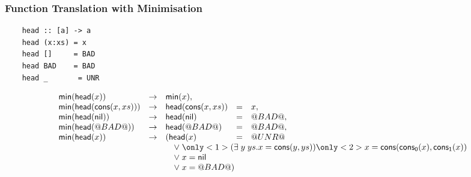 \documentclass[serif,professionalfont]{beamer}
\begin{document}
\begin{frame}[fragile]
  \frametitle{Function Translation with Minimisation}

  \begin{verbatim}
    head :: [a] -> a
    head (x:xs) = x
    head []     = BAD
    head BAD    = BAD
    head _       = UNR
  \end{verbatim}
  \[\begin{array}{lllll}
  \Min(\head{x})            & \to & \Min(x),            &   & \\
  \Min(\head{\cons{x}{xs}}) & \to & \head{\cons{x}{xs}} & = & x,    \\
  \Min(\head{\nil})         & \to & \head{\nil}         & = & \bad, \\
  \Min(\head{\bad})         & \to & \head{\bad}         & = & \bad, \\
  \Min(\head{x})            & \to & (\head{x}            & = & \unr \\
  & & \multicolumn{3}{l}{\quad \lor \; \only<1>{(\exists \; y \; ys . x = \cons{y}{ys})}
                                   \only<2>{x = \cons{\conspi{x}}{\conspii{x}}}} \\
  & & \multicolumn{3}{l}{\quad \lor \; x = \nil} \\
  & & \multicolumn{3}{l}{\quad \lor \; x = \bad)}
  \end{array}\]

\end{frame}
\end{document}
